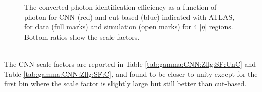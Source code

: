 \begin{figure}[htbp]
	\begin{tcolorbox}[colback=black!5!white,colframe=white!75!black]
    \caption{The converted photon identification efficiency as a function of photon \eT for CNN (red) and cut-based (blue) indicated with ATLAS, for data (full marks) and simulation (open marks) for 4 $|\eta|$ regions. Bottom ratios show the scale factors.}
    \label{fig:gamma:CNN:Zllg:Energy:C}
    \end{tcolorbox}
\end{figure}
\\
The CNN scale factors are reported in Table \ref{tab:gamma:CNN:Zllg:SF:UnC} and Table \ref{tab:gamma:CNN:Zllg:SF:C}, and found to be closer to unity except for the first \eT bin where the scale factor is slightly large but still better than cut-based. 
